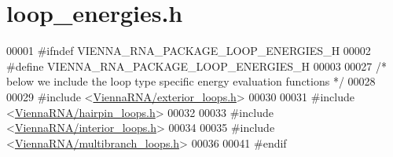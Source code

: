 \hypertarget{loop__energies_8h_source}{}\section{loop\+\_\+energies.\+h}
\label{loop__energies_8h_source}

\begin{DoxyCode}
00001 \textcolor{preprocessor}{#ifndef VIENNA\_RNA\_PACKAGE\_LOOP\_ENERGIES\_H}
00002 \textcolor{preprocessor}{#define VIENNA\_RNA\_PACKAGE\_LOOP\_ENERGIES\_H}
00003 
00027 \textcolor{comment}{/* below we include the loop type specific energy evaluation functions */}
00028 
00029 \textcolor{preprocessor}{#include <\hyperlink{exterior__loops_8h}{ViennaRNA/exterior\_loops.h}>}
00030 
00031 \textcolor{preprocessor}{#include <\hyperlink{hairpin__loops_8h}{ViennaRNA/hairpin\_loops.h}>}
00032 
00033 \textcolor{preprocessor}{#include <\hyperlink{interior__loops_8h}{ViennaRNA/interior\_loops.h}>}
00034 
00035 \textcolor{preprocessor}{#include <\hyperlink{multibranch__loops_8h}{ViennaRNA/multibranch\_loops.h}>}
00036 
00041 \textcolor{preprocessor}{#endif}
\end{DoxyCode}

